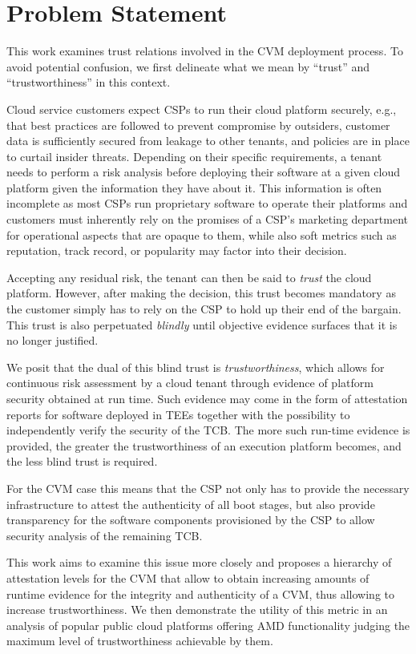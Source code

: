 \section{Problem Statement}

This work examines trust relations involved in the \ac{CVM} deployment process.
To avoid potential confusion, we first delineate what we mean by ``trust'' and
``trustworthiness'' in this context.

Cloud service customers expect \acp{CSP} to run their cloud platform securely,
e.g., that best practices are followed to prevent compromise by outsiders,
customer data is sufficiently secured from leakage to other tenants, and
policies are in place to curtail insider threats. Depending on their specific
requirements, a tenant needs to perform a risk analysis before deploying their
software at a given cloud platform given the information they have about
it. This information is often incomplete as most \acp{CSP} run proprietary
software to operate their platforms and customers must inherently rely on the
promises of a \ac{CSP}'s marketing department for operational aspects that are
opaque to them, while also soft metrics such as reputation, track record, or
popularity may factor into their decision.

Accepting any residual risk, the tenant can then be said to \emph{trust} the
cloud platform. However, after making the decision, this trust becomes mandatory
as the customer simply has to rely on the \ac{CSP} to hold up their end of the
bargain. This trust is also perpetuated \emph{blindly} until objective evidence
surfaces that it is no longer justified.

We posit that the dual of this blind trust is \emph{trustworthiness}, which
allows for continuous risk assessment by a cloud tenant through evidence of
platform security obtained at run time. Such evidence may come in the form of
attestation reports for software deployed in \acp{TEE} together with the
possibility to independently verify the security of the TCB. The more such
run-time evidence is provided, the greater the trustworthiness of an execution
platform becomes, and the less blind trust is required.

For the \ac{CVM} case this means that the \ac{CSP} not only has to provide the
necessary infrastructure to attest the authenticity of all boot stages, but also
provide transparency for the software components provisioned by the \ac{CSP} to
allow security analysis of the remaining \ac{TCB}.

This work aims to examine this issue more closely and proposes a hierarchy of
attestation levels for the \ac{CVM} that allow to obtain increasing amounts of
runtime evidence for the integrity and authenticity of a \ac{CVM}, thus allowing
to increase trustworthiness. We then demonstrate the utility of this metric in
an analysis of popular public cloud platforms offering AMD \sevsnp{}
functionality judging the maximum level of trustworthiness achievable by them.
